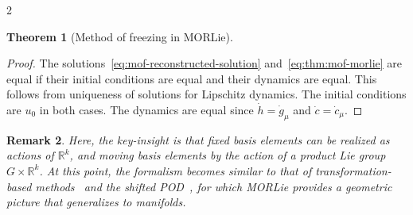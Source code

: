 \documentclass{article}
\newtheorem{theorem}{Theorem}[section]
\newtheorem{proof}{Proof}[theorem]
\newtheorem{remark}[theorem]{Remark}
\newcommand{\M}{\mathcal{M}}                                %
\newcommand{\R}{\mathbb{R}}                                 %
\begin{document}
\begin{multicols}{2}
\begin{theorem}[Method of freezing in MORLie]
\end{theorem}
\begin{proof}
    The solutions~\eqref{eq:mof-reconstructed-solution} and~\eqref{eq:thm:mof-morlie} are equal if their initial conditions are equal and their dynamics are equal. This follows from uniqueness of solutions for Lipschitz dynamics. The initial conditions are $u_0$ in both cases. The dynamics are equal since $\dot{h} = \dot{g}_\mu$ and $\dot{c} = \dot{c}_\mu$.  
\end{proof}
    

\begin{remark}
    Here, the key-insight is that fixed basis elements can be realized as actions of $\R^k$, and moving basis elements by the action of a product Lie group $G\times\R^k$. At this point, the formalism becomes similar to that of transformation-based methods~\cite{Cagniart2019,Cagniart2020_thesis,Black2020,Schulze2023} and the shifted POD~\cite{Reiss2018,Krah2025}, for which MORLie provides a geometric picture that generalizes to manifolds.
\end{remark}



\end{multicols}
\end{document}
